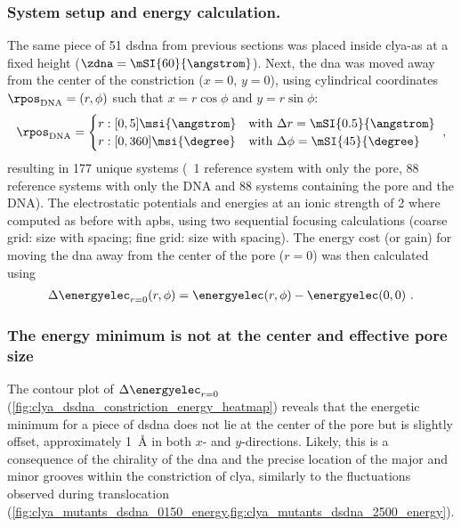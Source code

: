 \subsubsection{System setup and energy calculation.}
%

The same piece of \SI{51}{\bp} \gls{dsdna} from previous sections was placed inside \gls{clya-as} at a fixed
height ($\zdna = \mSI{60}{\angstrom}$). Next, the \gls{dna} was moved away from the center of the
constriction ($x = 0$, $y = 0$), using cylindrical coordinates $\rpos_{\mathrm{DNA}} = (r, \phi)$ such that
$x = r \cos{\phi}$ and $y = r \sin{\phi}$:
%
\begin{equation}
  \rpos_{\mathrm{DNA}} = %
  \begin{cases}
    r: [0,5] \msi{\angstrom} &\mbox{with } \Delta r    = \mSI{0.5}{\angstrom} \\
    r: [0,360] \msi{\degree} &\mbox{with } \Delta \phi = \mSI{45}{\degree} \\
  \end{cases}
  \text{ ,}
\end{equation}
%
resulting in 177 unique systems (\ie~1 reference system with only the pore, 88 reference systems with only the
DNA and 88 systems containing the pore and the DNA). The electrostatic potentials and energies at an ionic
strength of \SI{2}{\Molar} where computed as before with \gls{apbs}, using two sequential focusing
calculations (coarse grid:  size with
 spacing; fine grid:  size with
 spacing). The energy cost (or gain) for moving the \gls{dna} away from
the center of the pore ($r = 0$) was then calculated using
%
\begin{align}\label{eq:electrostatics_deltadelta_energy}
  \Delta \energyelec_{r=0} (r, \phi) = \energyelec (r, \phi) - \energyelec (0,0)
  \text{  .}
\end{align}
%

\subsubsection{The energy minimum is not at the center and effective pore size}
%


The contour plot of $\Delta \energyelec_{r=0}$ (\cref{fig:clya_dsdna_constriction_energy_heatmap}) reveals
that the energetic minimum for a piece of \gls{dsdna} does not lie at the center of the pore but is slightly
offset, approximately \SI{1}{\angstrom} in both $x$- and $y$-directions. Likely, this is a consequence of the
chirality of the \gls{dna} and the precise location of the major and minor grooves within the constriction of
\gls{clya}, similarly to the fluctuations observed during translocation
(\cref{fig:clya_mutants_dsdna_0150_energy,fig:clya_mutants_dsdna_2500_energy}). 

